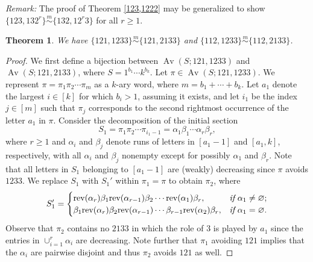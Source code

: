 \documentclass[11pt]{amsart}
\theoremstyle{plain}
\newtheorem{theorem}{Theorem}[section]
\theoremstyle{definition}
\newcommand{\csim}{\stackrel{m}{\sim}}
\DeclareMathOperator{\Av}{Av}
\begin{document}
\noindent\emph{Remark:}
The proof of Theorem \ref{123,1222} may be generalized to show
$\{123,132^r\}\csim\{132,12^r3\}$ for all $r \geq 1$.

\begin{theorem}\label{121,1233}
 We have
$\{121,1233\}\csim\{121,2133\}$ and $\{112,1233\}\csim\{112,2133\}$.
\end{theorem}
\begin{proof}
We first define a bijection between $\Av(S;121,1233)$ and $\Av(S;121,2133)$, where
$S=1^{b_1}\cdots k^{b_k}$. Let $\pi \in \Av(S;121,1233)$.  We represent $\pi=\pi_1\pi_2\cdots
\pi_m$ as a $k$-ary word, where $m=b_1+\cdots+b_k$.  Let $a_1$ denote the largest $i \in [k]$ for
which $b_i>1$, assuming it exists, and let $i_1$ be the index $j \in [m]$ such that $\pi_j$
corresponds to the second rightmost occurrence of the letter $a_1$ in $\pi$.  Consider the
decomposition of the initial section
$$S_1=\pi_1\pi_2\cdots \pi_{i_1-1}=\alpha_1\beta_1\cdots \alpha_r\beta_r,$$
where $r \geq 1$ and $\alpha_i$ and $\beta_j$ denote runs of letters in $[a_1-1]$ and $[a_1,k]$,
respectively, with all $\alpha_i$ and $\beta_j$ nonempty except for possibly $\alpha_1$ and
$\beta_r$.  Note that all letters in $S_1$ belonging to $[a_1-1]$ are (weakly) decreasing since $\pi$
avoids $1233$.  We replace $S_1$ with $S_1'$ within $\pi_1=\pi$ to obtain $\pi_2$, where
$$S_1'=\begin{cases}
{\displaystyle
\text{rev}(\alpha_r)\beta_1\text{rev}(\alpha_{r-1})\beta_2\cdots\text{rev}(\alpha_1)\beta_r},
&\emph{if}~\alpha_1\neq\varnothing;\\
{\displaystyle
\beta_1\text{rev}(\alpha_r)\beta_2\text{rev}(\alpha_{r-1})\cdots\beta_{r-1}\text{rev}
(\alpha_2)\beta_r}, &\emph{if}~\alpha_1=\varnothing.\\
\end{cases}$$
Observe that $\pi_2$ contains no $2133$ in which the role of $3$ is played by $a_1$ since the
entries in $\cup_{i=1}^r\alpha_i$ are decreasing.  Note further that $\pi_1$ avoiding $121$ implies
that the $\alpha_i$ are pairwise disjoint and thus $\pi_2$ avoids $121$ as well.


\end{proof}
\end{document}
